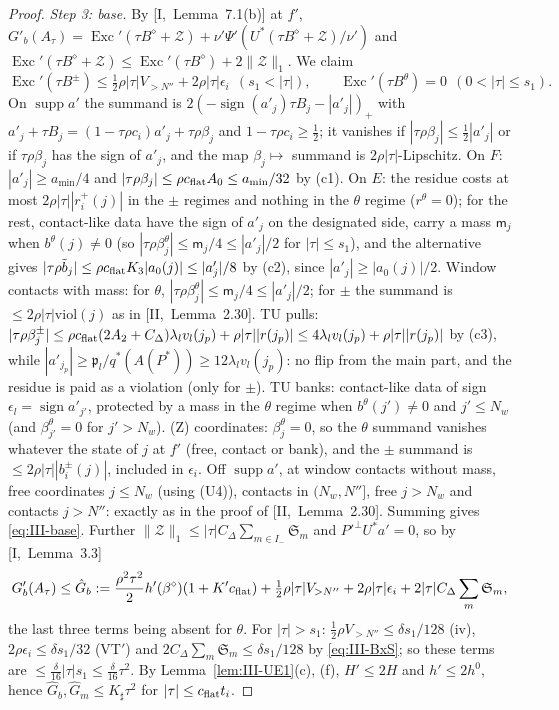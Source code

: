 \documentclass[10pt]{amsart}
\theoremstyle{definition}
\theoremstyle{remark}
\newcommand{\supp}{\operatorname{supp}}
\newcommand{\sgn}{\operatorname{sign}}
\newcommand{\Exc}{\operatorname{Exc}}
\begin{document}
\begin{proof}
\emph{Step 3: base.}  By [I,~Lemma~7.1(b)] at $f'$, $G'_b(A_\tau)=\Exc'(\tau
B^\diamond+\mathcal Z)+\nu'\Psi'(U^*(\tau B^\diamond+\mathcal Z)/\nu')$ and
$\Exc'(\tau B^\diamond+\mathcal Z)\le\Exc'(\tau B^\diamond)+2\|\mathcal Z\|_1$.  We
claim
\begin{equation}\label{eq:III-base}
 \Exc'(\tau B^\pm)\le\tfrac12\rho|\tau|V_{>N''}+2\rho|\tau|\epsilon_i\ \ (s_1<|\tau|),
 \qquad\Exc'(\tau B^\theta)=0\ \ (0<|\tau|\le s_1).
\end{equation}
On $\supp a'$ the summand is $2(-\sgn(a'_j)\tau B_j-|a'_j|)_+$ with $a'_j+\tau
B_j=(1-\tau\rho c_i)a'_j+\tau\rho\beta_j$ and $1-\tau\rho c_i\ge\frac12$; it
vanishes if $|\tau\rho\beta_j|\le\frac12|a'_j|$ or if $\tau\rho\beta_j$ has the
sign of $a'_j$, and the map $\beta_j\mapsto$ summand is $2\rho|\tau|$-Lipschitz.
On $F$: $|a'_j|\ge a_{\min}/4$ and $|\tau\rho\beta_j|\le\rho c_{\rm flat}A_0\le
a_{\min}/32$ by (c1).  On $E$: the residue costs at most $2\rho|\tau||r^+_i(j)|$ in
the $\pm$ regimes and nothing in the $\theta$ regime ($r^\theta=0$); for the rest,
contact-like data have the sign of $a'_j$ on the designated side, carry a mass
$\mathsf m_j$ when $b^\theta(j)\ne0$ (so $|\tau\rho\beta^\theta_j|\le\mathsf m_j/4
\le|a'_j|/2$ for $|\tau|\le s_1$), and the alternative gives $|\tau\rho\tilde
b_j|\le\rho c_{\rm flat}K_3|a_0(j)|\le|a'_j|/8$ by (c2), since $|a'_j|\ge
|a_0(j)|/2$.  Window contacts with mass: for $\theta$, $|\tau\rho\beta^\theta_j|\le
\mathsf m_j/4\le|a'_j|/2$; for $\pm$ the summand is $\le2\rho|\tau|\mathrm{viol}(j)$
as in [II,~Lemma~2.30].  TU pulls: $|\tau\rho\beta^\pm_j|\le\rho c_{\rm flat}
(2A_2+C_\Delta)\lambda_lv_l(j_p)+\rho|\tau||r(j_p)|\le4\lambda_lv_l(j_p)+\rho|\tau|
|r(j_p)|$ by (c3), while $|a'_{j_p}|\ge\mathfrak p_l/q^*(A(P^*))\ge12\lambda_l
v_l(j_p)$: no flip from the main part, and the residue is paid as a violation
(only for $\pm$).  TU banks: contact-like data of sign $\epsilon_l=\sgn a'_{j'}$,
protected by a mass in the $\theta$ regime when $b^\theta(j')\ne0$ and $j'\le N_w$
(and $\beta^\theta_{j'}=0$ for $j'>N_w$).  (Z) coordinates: $\beta^\theta_j=0$, so
the $\theta$ summand vanishes whatever the state of $j$ at $f'$ (free, contact or
bank), and the $\pm$ summand is $\le2\rho|\tau||b^\pm_i(j)|$, included in
$\epsilon_i$.  Off $\supp a'$, at window contacts without mass, free coordinates
$j\le N_w$ (using (U4)), contacts in $(N_w,N'']$, free $j>N_w$ and contacts
$j>N''$: exactly as in the proof of [II,~Lemma~2.30].  Summing gives
\eqref{eq:III-base}.  Further $\|\mathcal Z\|_1\le|\tau|C_\Delta\sum_{m\in I_-}
\mathfrak S_m$ and $P'^\perp U^*a'=0$, so by [I,~Lemma~3.3]
\[
 G'_b(A_\tau)\le\hat G_b:=\frac{\rho^2\tau^2}2h'(\beta^\diamond)(1+K'c_{\rm flat})
 +\tfrac12\rho|\tau|V_{>N''}+2\rho|\tau|\epsilon_i+2|\tau|C_\Delta\sum_m\mathfrak S_m,
\]
the last three terms being absent for $\theta$.  For $|\tau|>s_1$:
$\frac12\rho V_{>N''}\le\delta s_1/128$ (iv), $2\rho\epsilon_i\le\delta s_1/32$
(VT$'$) and $2C_\Delta\sum_m\mathfrak S_m\le\delta s_1/128$ by \eqref{eq:III-BxS};
so these terms are $\le\frac\delta{16}|\tau|s_1\le\frac\delta{16}\tau^2$.  By
Lemma~\ref{lem:III-UE1}(c), (f), $H'\le2H$ and $h'\le2h^0$, hence
$\hat G_b,\hat G_m\le K_\sharp\tau^2$ for $|\tau|\le c_{\rm flat}t_i$.


\end{proof}
\end{document}
